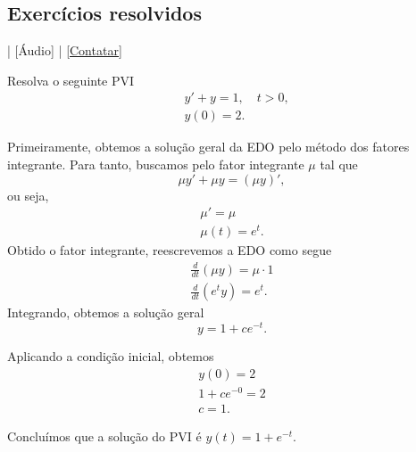 \subsection*{Exercícios resolvidos}

\begin{flushright}
  [Vídeo] | [Áudio] | \href{https://phkonzen.github.io/notas/contato.html}{[Contatar]}
\end{flushright}

\begin{exeresol}
  Resolva o seguinte PVI
  \begin{align}
    &y' + y = 1, \quad t>0,\\
    &y(0) = 2.
  \end{align}
\end{exeresol}
\begin{resol}
  Primeiramente, obtemos a solução geral da EDO pelo método dos fatores integrante. Para tanto, buscamos pelo fator integrante $\mu$ tal que
  \begin{equation}
    \mu y' + \mu y = (\mu y)',
  \end{equation}
  ou seja,
  \begin{gather}
    \mu' = \mu \\
    \mu(t) = e^{t}.
  \end{gather}
  Obtido o fator integrante, reescrevemos a EDO como segue
  \begin{gather}
    \frac{d}{dt}\left(\mu y\right) = \mu\cdot 1 \\
    \frac{d}{dt}\left(e^ty\right) = e^t.
  \end{gather}
  Integrando, obtemos a solução geral
  \begin{equation}
    y = 1 + ce^{-t}.
  \end{equation}

  Aplicando a condição inicial, obtemos
  \begin{gather}
    y(0) = 2 \\
    1 + ce^{-0} = 2 \\
    c = 1.
  \end{gather}

  Concluímos que a solução do PVI é $y(t) = 1 + e^{-t}$.
\end{resol}

